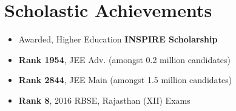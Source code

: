 \section*{\sc Scholastic Achievements}
\vspace{-2mm}
\hrulefill
\vspace{1mm}

\begin{itemize}
    \item Awarded, Higher Education \textbf{INSPIRE Scholarship}
    \item \textbf{Rank 1954}, JEE Adv. (amongst 0.2 million candidates)
    \item \textbf{Rank 2844}, JEE Main (amongst 1.5 million candidates)
    \item \textbf{Rank 8}, 2016 RBSE, Rajasthan (XII) Exams
\end{itemize}
